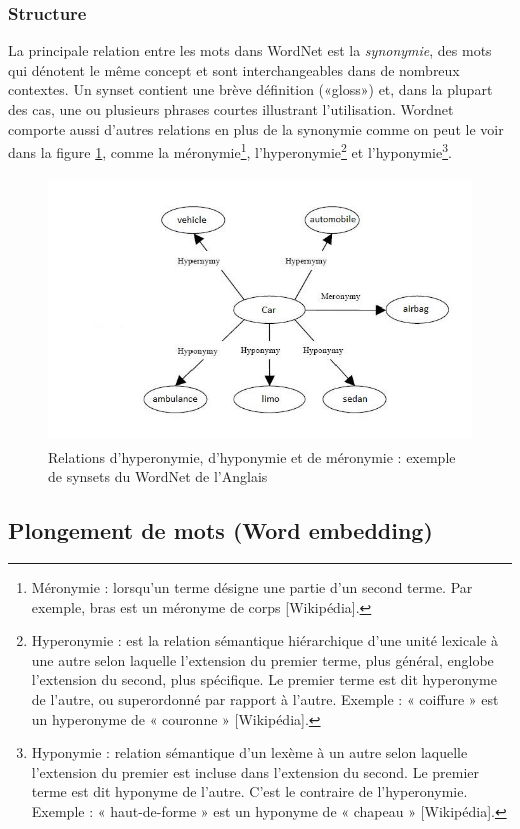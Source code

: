         \subsubsection{Structure}
        La principale relation entre les mots dans WordNet est la \emph{synonymie}, des mots qui dénotent le même concept et sont interchangeables dans de nombreux contextes. Un synset contient une brève définition («gloss») et, dans la plupart des cas, une ou plusieurs phrases courtes illustrant l'utilisation. Wordnet comporte aussi d'autres relations en plus de la synonymie comme on peut le voir dans la figure \ref{synset}, comme la méronymie\footnote{Méronymie : lorsqu'un terme désigne une partie d'un second terme. Par exemple, bras est un méronyme de corps [Wikipédia].}, l'hyperonymie\footnote{Hyperonymie : est la relation sémantique hiérarchique d'une unité lexicale à une autre selon laquelle l'extension du premier terme, plus général, englobe l'extension du second, plus spécifique. Le premier terme est dit hyperonyme de l'autre, ou superordonné par rapport à l'autre. Exemple : « coiffure » est un hyperonyme de « couronne » [Wikipédia].} et l'hyponymie\footnote{Hyponymie : relation sémantique d'un lexème à un autre selon laquelle l'extension du premier est incluse dans l'extension du second. Le premier terme est dit hyponyme de l'autre. C'est le contraire de l'hyperonymie. Exemple : « haut-de-forme » est un hyponyme de « chapeau » [Wikipédia].}. 
        \begin{figure}[H]
            \centering
                \includegraphics[height=200pt,width=330pt]{img/chapter2/wordnet.jpg}
            \caption{Relations d'hyperonymie, d'hyponymie et de méronymie : exemple de synsets du WordNet de l'Anglais \cite{synsetFigure}}
            \label{synset}
        \end{figure}
    
    
    \subsection{Plongement de mots (Word embedding)\label{wordembd}}
    
